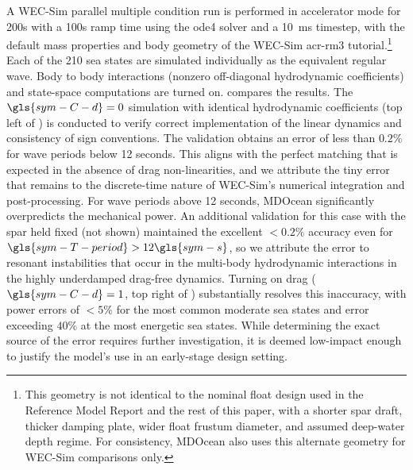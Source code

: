 A WEC-Sim parallel multiple condition run is performed in accelerator mode for 200s with a 100s ramp time using the ode4 solver and a 10~ms timestep, with the default mass properties and body geometry of the WEC-Sim \gls{acr-rm3} tutorial.\footnote{This geometry is not identical to the nominal float design used in the Reference Model Report \citep{RM3} and the rest of this paper, with a shorter spar draft, thicker damping plate, wider float frustum diameter, and assumed deep-water depth regime.
For consistency, MDOcean also uses this alternate geometry for WEC-Sim comparisons only.}
Each of the 210 sea states are simulated individually as the equivalent regular wave.
Body to body interactions (nonzero off-diagonal hydrodynamic coefficients) and state-space computations are turned on.
 compares the results.
The $\gls{sym-C-d}=0$ simulation with identical hydrodynamic coefficients (top left of ) is conducted to verify correct implementation of the linear dynamics and consistency of sign conventions.
The validation obtains an error of less than $0.2\%$ for wave periods below 12 seconds.
This aligns with the perfect matching that is expected in the absence of drag non-linearities, and we attribute the tiny error that remains to the discrete-time nature of WEC-Sim's numerical integration and post-processing.
For wave periods above 12 seconds, MDOcean significantly overpredicts the mechanical power.
An additional validation for this case with the spar held fixed (not shown) maintained the excellent $<0.2\%$ accuracy even for $\gls{sym-T-period}>12 \gls{sym-s}$, so we attribute the error to resonant instabilities that occur in the multi-body hydrodynamic interactions in the highly underdamped drag-free dynamics.
Turning on drag ($\gls{sym-C-d}=1$, top right of ) substantially resolves this inaccuracy, with power errors of $<5\%$ for the most common moderate sea states and error exceeding $40\%$ at the most energetic sea states.
While determining the exact source of the error requires further investigation, it is deemed low-impact enough to justify the model's use in an early-stage design setting.

